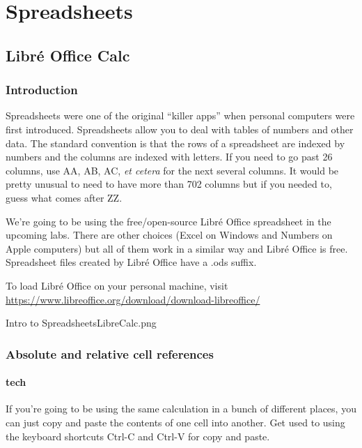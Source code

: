  
\chapter{Spreadsheets}


\section{Libr\'{e} Office Calc}
\label{sec:calc}

\subsection{Introduction}


Spreadsheets were one of the original ``killer apps'' when personal computers were first introduced.  Spreadsheets allow you to deal with tables of numbers and other data.  The standard convention is that the rows of a spreadsheet are indexed by numbers and the columns are indexed with letters.  If you need to go past 26 columns, use AA, AB, AC, {\em et cetera} for the next several columns.  It would be pretty unusual to need to have more than 702 columns but if you needed to, guess what comes after ZZ.

We're going to be using the free/open-source Libr\'{e} Office spreadsheet in the upcoming labs.  There are other choices (Excel on Windows and Numbers on Apple computers) but all of them work in a similar way and Libr\'{e} Office is free.  Spreadsheet files created by 
Libr\'{e} Office have a .ods suffix.  

To load Libr\'{e} Office on your personal machine, visit \url{https://www.libreoffice.org/download/download-libreoffice/}

\clearpage
\begin{worksheet}{11}{Intro to Spreadsheets}{LibreCalc.png}

\end{worksheet}
\clearpage


\subsection{Absolute and relative cell references}

\subsubsection{tech}

If you're going to be using the same calculation in a bunch of different places, you can just copy and paste the contents of one cell into another.  Get used to using the keyboard shortcuts Ctrl-C and Ctrl-V for copy and paste.  

